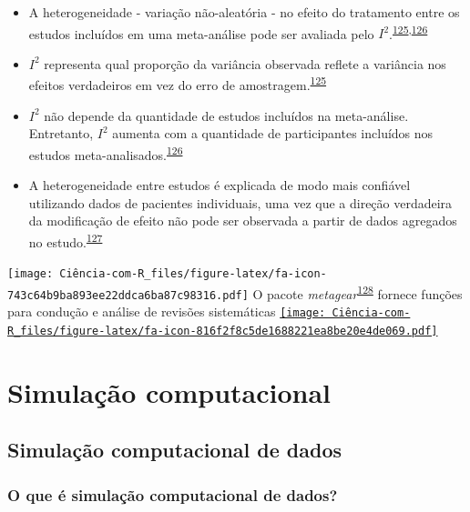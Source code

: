 \documentclass[
]{book}
\begin{document}
\begin{itemize}
\item
  A heterogeneidade - variação não-aleatória - no efeito do tratamento entre os estudos incluídos em uma meta-análise pode ser avaliada pelo \(I^{2}\).\textsuperscript{\protect\hyperlink{ref-Borenstein2022}{125},\protect\hyperlink{ref-Ruxfccker2008}{126}}
\item
  \(I^{2}\) representa qual proporção da variância observada reflete a variância nos efeitos verdadeiros em vez do erro de amostragem.\textsuperscript{\protect\hyperlink{ref-Borenstein2022}{125}}
\item
  \(I^{2}\) não depende da quantidade de estudos incluídos na meta-análise. Entretanto, \(I^{2}\) aumenta com a quantidade de participantes incluídos nos estudos meta-analisados.\textsuperscript{\protect\hyperlink{ref-Ruxfccker2008}{126}}
\item
  A heterogeneidade entre estudos é explicada de modo mais confiável utilizando dados de pacientes individuais, uma vez que a direção verdadeira da modificação de efeito não pode ser observada a partir de dados agregados no estudo.\textsuperscript{\protect\hyperlink{ref-degrooth2023}{127}}
\end{itemize}

\texttt{[image: Ciência-com-R\_files/figure-latex/fa-icon-743c64b9ba893ee22ddca6ba87c98316.pdf]} O pacote \emph{metagear}\textsuperscript{\protect\hyperlink{ref-metagear}{128}} fornece funções para condução e análise de revisões sistemáticas \href{https://cran.r-project.org/web/packages/metagear/index.html}{\texttt{[image: Ciência-com-R\_files/figure-latex/fa-icon-816f2f8c5de1688221ea8be20e4de069.pdf]}}

\hypertarget{simulacao-computacional}{%
\chapter{\texorpdfstring{\textbf{Simulação computacional}}{Simulação computacional}}\label{simulacao-computacional}}

\hypertarget{simulacao-computacional-dados}{%
\section{Simulação computacional de dados}\label{simulacao-computacional-dados}}

\hypertarget{o-que-uxe9-simulauxe7uxe3o-computacional-de-dados}{%
\subsection{O que é simulação computacional de dados?}\label{o-que-uxe9-simulauxe7uxe3o-computacional-de-dados}}
\end{document}
